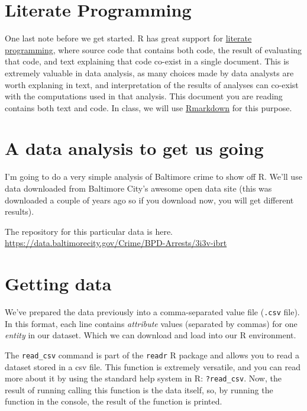 \documentclass[12pt,]{book}
\theoremstyle{definition}
\theoremstyle{definition}
\theoremstyle{remark}
\begin{document}
\section{Literate Programming}\label{literate-programming}

One last note before we get started. R has great support for
\href{http://en.wikipedia.org/wiki/Literate_programming}{literate
programming}, where source code that contains both code, the result of
evaluating that code, and text explaining that code co-exist in a single
document. This is extremely valuable in data analysis, as many choices
made by data analysts are worth explaning in text, and interpretation of
the results of analyses can co-exist with the computations used in that
analysis. This document you are reading contains both text and code. In
class, we will use \href{http://rmarkdown.rstudio.com/}{Rmarkdown} for
this purpose.

\section{A data analysis to get us
going}\label{a-data-analysis-to-get-us-going}

I'm going to do a very simple analysis of Baltimore crime to show off R.
We'll use data downloaded from Baltimore City's awesome open data site
(this was downloaded a couple of years ago so if you download now, you
will get different results).

The repository for this particular data is here.
\url{https://data.baltimorecity.gov/Crime/BPD-Arrests/3i3v-ibrt}

\section{Getting data}\label{getting-data}

We've prepared the data previously into a comma-separated value file
(\texttt{.csv} file). In this format, each line contains
\emph{attribute} values (separated by commas) for one \emph{entity} in
our dataset. Which we can download and load into our R environment.

The \texttt{read\_csv} command is part of the \texttt{readr} R package
and allows you to read a dataset stored in a csv file. This function is
extremely versatile, and you can read more about it by using the
standard help system in R: \texttt{?read\_csv}. Now, the result of
running calling this function is the data itself, so, by running the
function in the console, the result of the function is printed.
\end{document}
